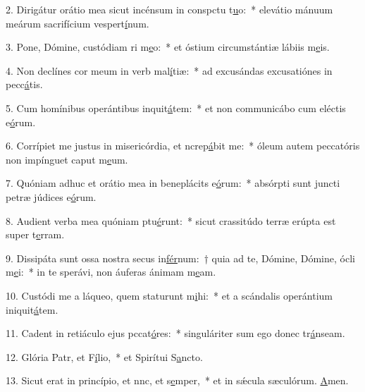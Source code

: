 2. Dirigátur orátio mea sicut incénsum in conspctu t\uline{u}o:~* elevátio mánuum meárum sacrifícium vespert\uline{í}num.\par 
3. Pone, Dómine, custódiam ri m\uline{e}o:~* et óstium circumstántiæ lábiis m\uline{e}is.\par 
4. Non declínes cor meum in verb mal\uline{í}tiæ:~* ad excusándas excusatiónes in pecc\uline{á}tis.\par 
5. Cum homínibus operántibus inquit\uline{á}tem:~* et non communicábo cum eléctis e\uline{ó}rum.\par 
6. Corrípiet me justus in misericórdia, et ncrep\uline{á}bit me:~* óleum autem peccatóris non impínguet caput m\uline{e}um.\par 
7. Quóniam adhuc et orátio mea in beneplácits e\uline{ó}rum:~* absórpti sunt juncti petræ júdices e\uline{ó}rum.\par 
8. Audient verba mea quóniam ptu\uline{é}runt:~* sicut crassitúdo terræ erúpta est super t\uline{e}rram.\par 
9. Dissipáta sunt ossa nostra secus in\uline{fér}num:~† quia ad te, Dómine, Dómine, ócli m\uline{e}i:~* in te sperávi, non áuferas ánimam m\uline{e}am.\par 
10. Custódi me a láqueo, quem staturunt m\uline{i}hi:~* et a scándalis operántium iniquit\uline{á}tem.\par 
11. Cadent in retiáculo ejus pccat\uline{ó}res:~* singuláriter sum ego donec tr\uline{á}nseam.\par 
12. Glória Patr, et F\uline{í}lio,~* et Spirítui S\uline{a}ncto.\par 
13. Sicut erat in princípio, et nnc, et s\uline{e}mper,~* et in sǽcula sæculórum. \uline{A}men.\par 
